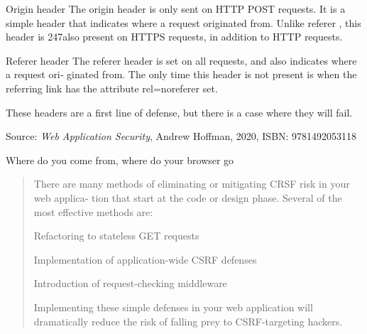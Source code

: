 \documentclass[Screen16to9,17pt]{foils}
\begin{document}
\begin{list2}
    \item Origin header
The origin header is only sent on HTTP POST requests. It is a simple header
that indicates where a request originated from. Unlike referer , this header is
247also present on HTTPS requests, in addition to HTTP requests.

\item Referer header
The referer header is set on all requests, and also indicates where a request ori‐
ginated from. The only time this header is not present is when the referring link
has the attribute rel=noreferer set.
\end{list2}

These headers are a first line of defense, but there is a case where they will fail.


Source: \emph{Web Application Security}, Andrew Hoffman, 2020, ISBN: 9781492053118

\begin{list2}
\item Where do you come from, where do your browser go
\end{list2}



\begin{quote}
There are many methods of eliminating or mitigating CRSF risk in your web applica‐
tion that start at the code or design phase.
Several of the most effective methods are:
\begin{list2}
\item Refactoring to stateless GET requests
\item Implementation of application-wide CSRF defenses
\item Introduction of request-checking middleware
\end{list2}
Implementing these simple defenses in your web application will dramatically reduce
the risk of falling prey to CSRF-targeting hackers.
\end{quote}





\end{document}
